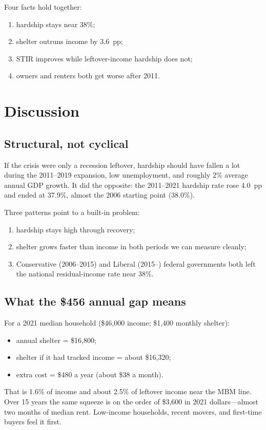 \documentclass[11pt,letterpaper]{article}
\begin{document}
Four facts hold together:
\begin{enumerate}[leftmargin=1.6em]
  \item hardship stays near 38\%;
  \item shelter outruns income by 3.6~pp;
  \item STIR improves while leftover-income hardship does not;
  \item owners and renters both get worse after 2011.
\end{enumerate}

\section{Discussion}
\label{sec:discussion}

\subsection{Structural, not cyclical}
\label{sec:structural}

If the crisis were only a recession leftover, hardship should have fallen a lot during the 2011--2019 expansion, low unemployment, and roughly 2\% average annual GDP growth.
It did the opposite: the 2011--2021 hardship rate rose 4.0~pp and ended at 37.9\%, almost the 2006 starting point (38.0\%).

Three patterns point to a built-in problem:
\begin{enumerate}[leftmargin=1.6em]
  \item hardship stays high through recovery;
  \item shelter grows faster than income in both periods we can measure cleanly;
  \item Conservative (2006--2015) and Liberal (2015--) federal governments both left the national residual-income rate near 38\%.
\end{enumerate}

\subsection{What the \$456 annual gap means}
\label{sec:gap}

For a 2021 median household (\$46,000 income; \$1,400 monthly shelter):
\begin{itemize}[leftmargin=1.4em]
  \item annual shelter = \$16,800;
  \item shelter if it had tracked income = about \$16,320;
  \item extra cost = \$480 a year (about \$38 a month).
\end{itemize}
That is 1.6\% of income and about 2.5\% of leftover income near the MBM line.
Over 15 years the same squeeze is on the order of \$3,600 in 2021 dollars---almost two months of median rent.
Low-income households, recent movers, and first-time buyers feel it first.
\end{document}
